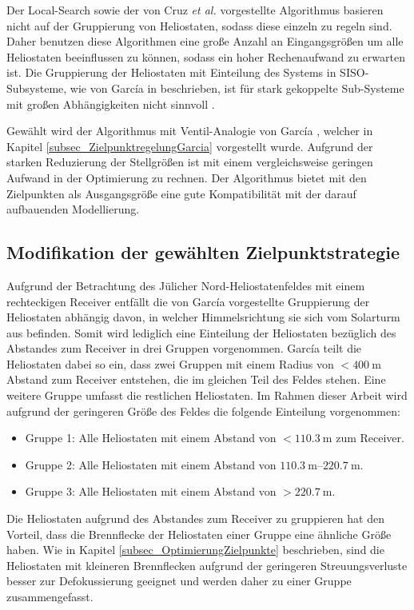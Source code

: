 Der Local-Search \cite{Maldonado}\cite{Maldonado2} sowie der von Cruz \textit{et al.} \cite{Cruz} vorgestellte Algorithmus basieren nicht auf der Gruppierung von Heliostaten, sodass diese einzeln zu regeln sind.
Daher benutzen diese Algorithmen eine große Anzahl an Eingangsgrößen um alle Heliostaten beeinflussen zu können, sodass ein hoher Rechenaufwand zu erwarten ist.
Die Gruppierung der Heliostaten mit Einteilung des Systems in SISO-Subsysteme, wie von García in \cite{Garcia1} beschrieben, ist für stark gekoppelte Sub-Systeme mit großen Abhängigkeiten nicht sinnvoll \cite[S.33]{DissZanger}.

Gewählt wird der Algorithmus mit Ventil-Analogie von García \cite{Garcia2}, welcher in Kapitel \ref{subsec_ZielpunktregelungGarcia} vorgestellt wurde.
Aufgrund der starken Reduzierung der Stellgrößen ist mit einem vergleichsweise geringen Aufwand in der Optimierung zu rechnen.
Der Algorithmus bietet mit den Zielpunkten als Ausgangsgröße eine gute Kompatibilität mit der darauf aufbauenden Modellierung.


\subsection{Modifikation der gewählten Zielpunktstrategie} \label{subsec_ModifikationAlgorithmus}
Aufgrund der Betrachtung des Jülicher Nord-Heliostatenfeldes mit einem rechteckigen Receiver entfällt die von García vorgestellte Gruppierung der Heliostaten abhängig davon, in welcher Himmelsrichtung sie sich vom Solarturm aus befinden.
Somit wird lediglich eine Einteilung der Heliostaten bezüglich des Abstandes zum Receiver in drei Gruppen vorgenommen.
García teilt die Heliostaten dabei so ein, dass zwei Gruppen mit einem Radius von $< \SI{400}{\metre}$ Abstand zum Receiver entstehen, die im gleichen Teil des Feldes stehen.
Eine weitere Gruppe umfasst die restlichen Heliostaten.
Im Rahmen dieser Arbeit wird aufgrund der geringeren Größe des Feldes die folgende Einteilung vorgenommen:
\begin{itemize}
\item Gruppe 1: Alle Heliostaten mit einem Abstand von $< \SI{110.3}{\metre}$ zum Receiver.
\item Gruppe 2: Alle Heliostaten mit einem Abstand von $\SIrange{110.3}{220.7}{\metre}$.
\item Gruppe 3: Alle Heliostaten mit einem Abstand von $> \SI{220.7}{\metre}$.
\end{itemize}

Die Heliostaten aufgrund des Abstandes zum Receiver zu gruppieren hat den Vorteil, dass die Brennflecke der Heliostaten einer Gruppe eine ähnliche Größe haben.
Wie in Kapitel \ref{subsec_OptimierungZielpunkte} beschrieben, sind die Heliostaten mit kleineren Brennflecken aufgrund der geringeren Streuungsverluste besser zur Defokussierung geeignet und werden daher zu einer Gruppe zusammengefasst.

